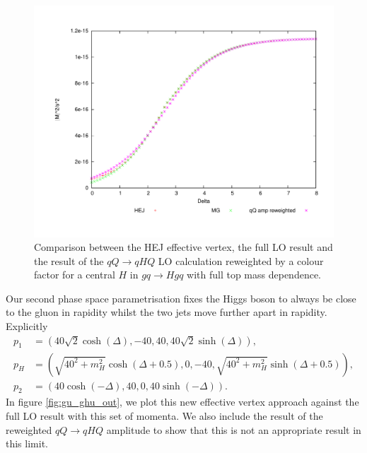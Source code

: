 \begin{figure}[t]
\centering
\includegraphics[scale=0.45]{Images/qg_qgH_central.pdf}
\caption{Comparison between the HEJ effective vertex, the full LO result and the result of the $qQ \to qHQ$ LO calculation reweighted by a colour factor for a central $H$ in $gq \to Hgq$ with full top mass dependence.}
\label{fig:gu_ghu_cen}
\end{figure}
Our second phase space parametrisation fixes the Higgs boson to always be close to the gluon in rapidity whilst the two jets move further apart in rapidity. Explicitly 
\begin{subequations}
\begin{align}
p_1 &= (40 \sqrt{2} \cosh(\Delta),-40,40,40 \sqrt{2} \sinh(\Delta)), \\
p_H &= (\sqrt{40^2+m_H^2} \cosh(\Delta+0.5), 0,-40,\sqrt{40^2+m_H^2}  \sinh(\Delta + 0.5)), \\
p_2 &= (40 \cosh(-\Delta),40,0,40 \sinh(-\Delta)).
\end{align}
\end{subequations}
In figure \ref{fig:gu_ghu_out}, we plot this new effective vertex approach against the full LO result with this set of momenta. We also include the result of the reweighted $qQ \to qHQ$ amplitude to show that this is not an appropriate result in this limit. 
